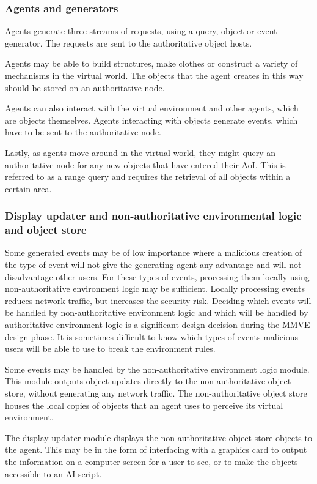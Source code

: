 \subsubsection{Agents and generators}

Agents generate three streams of requests, using a query, object or event generator. The requests are sent to the authoritative object hosts.

Agents may be able to build structures, make clothes or construct a variety of mechanisms in the virtual world. The objects that the agent creates in this way should be stored on an authoritative node.

Agents can also interact with the virtual environment and other agents, which are objects themselves. Agents interacting with objects generate events, which have to be sent to the authoritative node.

Lastly, as agents move around in the virtual world, they might query an authoritative node for any new objects that have entered their AoI. This is referred to as a range query and requires the retrieval of all objects within a certain area.

\subsubsection{Display updater and non-authoritative environmental logic and object store}

Some generated events may be of low importance where a malicious creation of the type of event will not give the generating agent any advantage and will not disadvantage other users. For these types of events, processing them locally using non-authoritative environment logic may be sufficient. Locally processing events reduces network traffic, but increases the security risk. Deciding which events will be handled by non-authoritative environment logic and which will be handled by authoritative environment logic is a significant design decision during the MMVE design phase. It is sometimes difficult to know which types of events malicious users will be able to use to break the environment rules.

Some events may be handled by the non-authoritative environment logic module. This module outputs object updates directly to the non-authoritative object store, without generating any network traffic. The non-authoritative object store houses the local copies of objects that an agent uses to perceive its virtual environment.

The display updater module displays the non-authoritative object store objects to the agent. This may be in the form of interfacing with a graphics card to output the information on a computer screen for a user to see, or to make the objects accessible to an AI script.

